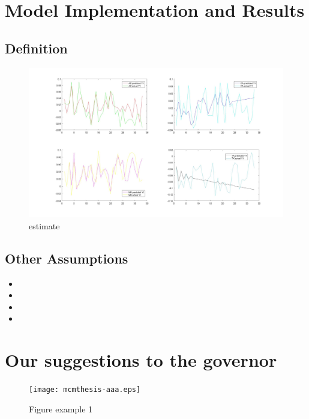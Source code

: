 \documentclass{mcmthesis}
\begin{document}
\section{Model Implementation and Results}

    \subsection{Definition}
    
        \begin{figure}[!hbpt]
          \centering
          \includegraphics[width=450px]{estimate.jpg}
          \caption{estimate}
        \end{figure}
    
    


    \subsection{Other Assumptions}

    \begin{itemize}
    \item
    \item
    \item
    \item
    \end{itemize}



\section{Our suggestions to the governor}
\begin{figure}[h]
\centering
\texttt{[image: mcmthesis-aaa.eps]}
\caption{Figure example 1} \label{fig:aa}
\end{figure}
\end{document}
